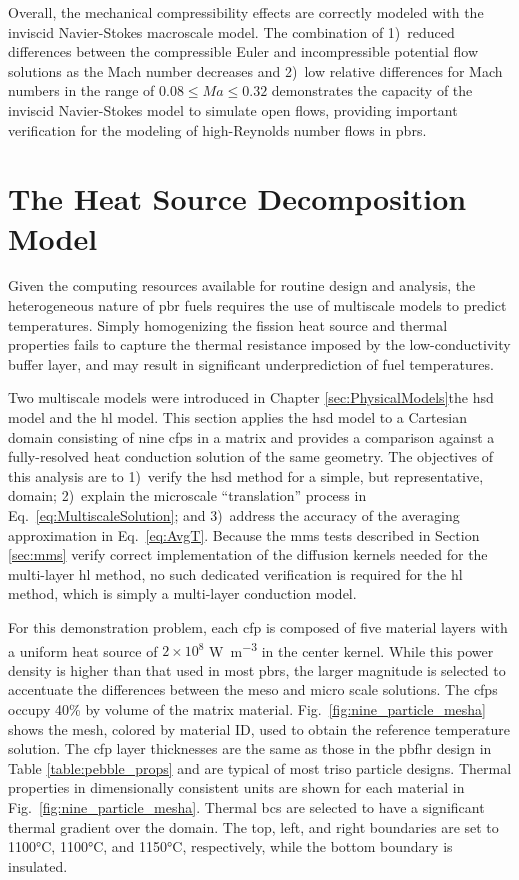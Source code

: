 Overall, the mechanical compressibility effects are correctly modeled with the inviscid Navier-Stokes macroscale model. The combination of 1)~reduced differences between the compressible Euler and incompressible potential flow solutions as the Mach number decreases and 2)~low relative differences for Mach numbers in the range of \(0.08\leq Ma\leq0.32\) demonstrates the capacity of the inviscid Navier-Stokes model to simulate open flows, providing important verification for the modeling of high-Reynolds number flows in \glspl{pbr}.

\section{The Heat Source Decomposition Model}
\label{sec:verification_meso}

Given the computing resources available for routine design and analysis, the heterogeneous nature of \gls{pbr} fuels requires the use of multiscale models to predict temperatures. Simply homogenizing the fission heat source and thermal properties fails to capture the thermal resistance imposed by the low-conductivity buffer layer, and may result in significant underprediction of fuel temperatures. 

Two multiscale models were introduced in Chapter \ref{sec:PhysicalModels}\mdash the \gls{hsd} model and the \gls{hl} model. This section applies the \gls{hsd} model to a Cartesian domain consisting of nine \glspl{cfp} in a matrix and provides a comparison against a fully-resolved heat conduction solution of the same geometry. The objectives of this analysis are to 1)~verify the \gls{hsd} method for a simple, but representative, domain; 2)~explain the microscale ``translation'' process in Eq.\ \eqref{eq:MultiscaleSolution}; and 3)~address the accuracy of the averaging approximation in Eq.\ \eqref{eq:AvgT}. Because the \gls{mms} tests described in Section \ref{sec:mms} verify correct implementation of the diffusion kernels needed for the multi-layer \gls{hl} method, no such dedicated verification is required for the \gls{hl} method, which is simply a multi-layer conduction model.

For this demonstration problem, each \gls{cfp} is composed of five material layers with a uniform heat source of \(2\times10^8\) \si{\watt\per\cubic\meter} in the center kernel. While this power density is higher than that used in most \glspl{pbr}, the larger magnitude is selected to accentuate the differences between the meso and micro scale solutions. The \glspl{cfp} occupy 40\% by volume of the matrix material. Fig.\ \ref{fig:nine_particle_mesha} shows the mesh, colored by material ID, used to obtain the reference temperature solution. The \gls{cfp} layer thicknesses are the same as those in the \gls{pbfhr} design in Table \ref{table:pebble_props} and are typical of most \gls{triso} particle designs. Thermal properties in dimensionally consistent units are shown for each material in Fig.\ \ref{fig:nine_particle_mesha}. Thermal \glspl{bc} are selected to have a significant thermal gradient over the domain. The top, left, and right boundaries are set to 1100\si{\celsius}, 1100\si{\celsius}, and 1150\si{\celsius}, respectively, while the bottom boundary is insulated.

